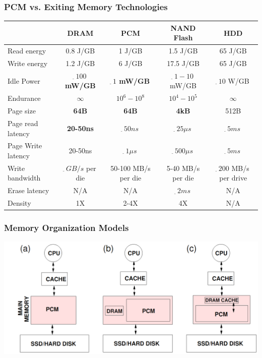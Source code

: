 \begin{frame}
\frametitle{PCM vs. Exiting Memory Technologies}

{\tiny
\begin{tabular}{|l|c|c|c|c|}
\hline
& DRAM & PCM & NAND Flash & HDD \\\hline
Read energy & 0.8 J/GB & 1 J/GB & 1.5 J/GB & 65 J/GB \\
Write energy & 1.2 J/GB & 6 J/GB & 17.5 J/GB & 65 J/GB \\
Idle Power & \textbf{\boldmath $_{\tilde{}}\,100$ mW/GB} & \textbf{\boldmath $_{\tilde{}}\,1$ mW/GB} & $_{\tilde{}}\,1-10$ mW/GB & $_{\tilde{}}\,10$ W/GB \\\hline
Endurance & $\infty$ & \boldmath $10^6-10^8$ & \boldmath $10^4-10^5$ & $\infty$ \\\hline
Page size & \textbf{64B} & \textbf{64B} & \textbf{4kB} & 512B \\
Page read latency & \textbf{20-50ns} & \boldmath $_{\tilde{}}\,50ns$ & $_{\tilde{}}\,25\mu s$ & $_{\tilde{}}\,5 ms$ \\
Page Write latency & 20-50ns & $_{\tilde{}}\,1\mu s$ & $_{\tilde{}}\,500\mu s$ & $_{\tilde{}}\,5 ms$ \\
Write bandwidth & $_{\tilde{}}\,GB/s$ per die & 50-100 MB/s per die & 5-40 MB/s per die & $_{\tilde{}}\,200$ MB/s per drive \\
Erase latency & N/A & N/A & $_{\tilde{}}\,2ms$ & N/A \\\hline
Density & 1X & 2-4X & 4X & N/A \\\hline
\end{tabular}
}
\end{frame}



\begin{frame}
\frametitle{Memory Organization Models}

\includegraphics[scale=0.3]{images/memoryorganization.png}
\end{frame}


